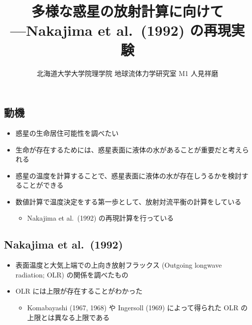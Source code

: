 \documentclass[aspectratio=149]{beamer}
\author{北海道大学大学院理学院 地球流体力学研究室 M1 人見祥磨}
\title{多様な惑星の放射計算に向けて\\---Nakajima et al.\ (1992) の再現実験}
\begin{document}
\begin{frame}
	\maketitle
\end{frame}

\begin{frame}
	\section{動機}
	\begin{itemize}
		\item 惑星の生命居住可能性を調べたい
		\item 生命が存在するためには、惑星表面に液体の水があることが重要だと考えられる
		\item 惑星の温度を計算することで、惑星表面に液体の水が存在しうるかを検討することができる
		\item 数値計算で温度決定をする第一歩として、放射対流平衡の計算をしている
			\begin{itemize}
				\item Nakajima et al.\ (1992) の再現計算を行っている
			\end{itemize}
	\end{itemize}
\end{frame}

\begin{frame}
	\section{Nakajima et al.\ (1992)}
	\begin{itemize}
		\item 表面温度と大気上端での上向き放射フラックス (Outgoing longwave radiation; OLR)
			の関係を調べたもの
		\item OLR には上限が存在することがわかった
			\begin{itemize}
				\item Komabayashi (1967, 1968) や Ingersoll (1969) によって得られた OLR の
					上限とは異なる上限である
			\end{itemize}
	\end{itemize}
\end{frame}
\end{document}

